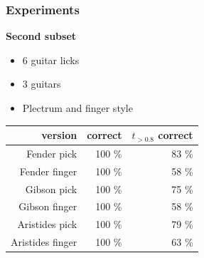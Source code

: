 \documentclass[table]{beamer}
\begin{document}
\begin{frame}
\frametitle{Experiments}
    {\large \textbf{Second subset}}
    \begin{itemize}
        \item 6 guitar licks
        \item 3 guitars
        \item Plectrum and finger style
    \end{itemize}
    \bigskip

    \hspace{+8mm}\begin{tabular}{r|rr}
        version          & correct & $t_{>0.8}$ correct \\
        \hline
        Fender pick      & 100 \%  & 83 \% \\
        Fender finger    & 100 \%  & 58 \% \\
        Gibson pick      & 100 \%  & 75 \% \\
        Gibson finger    & 100 \%  & 58 \% \\
        Aristides pick   & 100 \%  & 79 \% \\
        Aristides finger & 100 \%  & 63 \%
    \end{tabular}
\end{frame}
\end{document}
